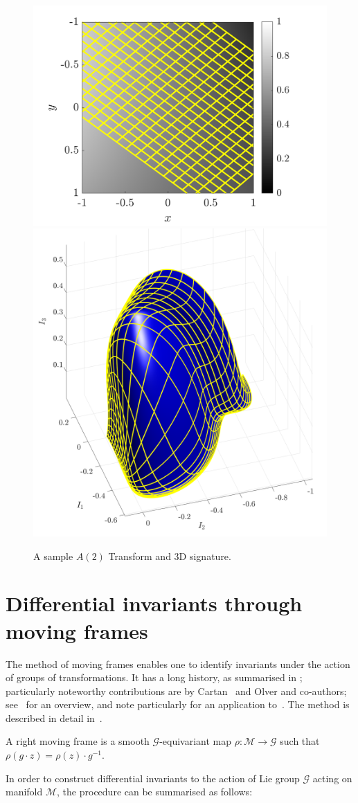 \documentclass[review,onefignum,onetabnum]{siamonline190516}
\begin{document}
\begin{figure}
\centering
\includegraphics[width=.45\textwidth]{Figs/f_transformed_A2.png}
\includegraphics[width=.45\textwidth]{Figs/A2_signature.png}
\caption{A sample $A(2)$ Transform and 3D signature.}
\label{fig:A2}
\end{figure}

\section{Differential invariants through moving frames}

The method of moving frames enables one to identify invariants under the action of groups of transformations. It has a long history, as summarised in \cite{Olver14}; particularly noteworthy contributions are by Cartan~\cite{Cartan37} and Olver and co-authors; see~\cite{Olver14} for an overview, and note particularly for an application to~\cite{Calabi98}. The method is described in detail in~\cite{OlverCIT}.

A right moving frame is a smooth $\mathcal{G}$-equivariant map $\rho : \mathcal{M} \to \mathcal{G}$ such that $\rho (g \cdot z) = \rho(z) \cdot g^{-1}$. 

In order to construct differential invariants to the action of Lie group $\mathcal{G}$ acting on manifold $\mathcal{M}$, the procedure can be summarised as follows:
\end{document}
